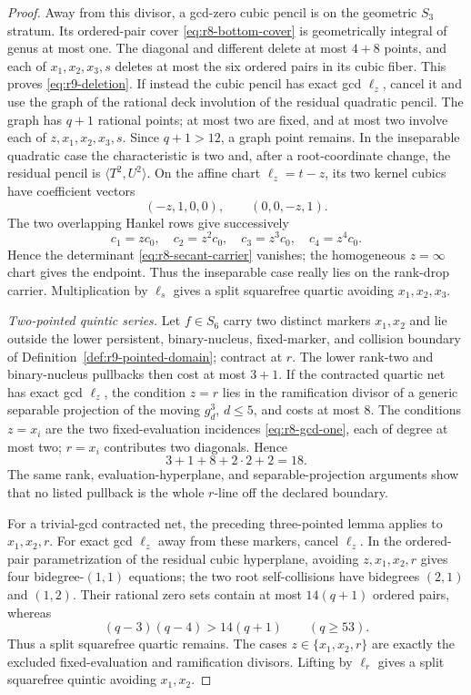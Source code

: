 \begin{proof}
Away from this divisor, a gcd-zero cubic pencil is on the geometric
$S_3$ stratum.  Its ordered-pair cover \eqref{eq:r8-bottom-cover} is
geometrically integral
of genus at most one.  The diagonal and different delete at most
$4+8$ points, and each of $x_1,x_2,x_3,s$ deletes at most the six
ordered pairs in its cubic fiber.  This proves
\eqref{eq:r9-deletion}.  If instead the
cubic pencil has exact gcd $\ell_z$, cancel it and use the graph of
the rational deck involution of the residual quadratic pencil.  The
graph has $q+1$ rational points; at most two are fixed, and at most two
involve each of $z,x_1,x_2,x_3,s$.  Since $q+1>12$, a graph point
remains.  In the inseparable quadratic case the characteristic is two
and, after a root-coordinate change, the residual pencil is
$\langle T^2,U^2\rangle$.  On the affine chart
$\ell_z=t-z$, its two kernel cubics have coefficient vectors
\[
             (-z,1,0,0),\qquad(0,0,-z,1).
\]
The two overlapping Hankel rows give successively
\[
 c_1=zc_0,\quad c_2=z^2c_0,\quad
 c_3=z^3c_0,\quad c_4=z^4c_0.
\]
Hence the determinant \eqref{eq:r8-secant-carrier} vanishes; the
homogeneous $z=\infty$
chart gives the endpoint.  Thus the inseparable case really lies on
the rank-drop carrier.  Multiplication by $\ell_s$ gives a split
squarefree quartic avoiding $x_1,x_2,x_3$.

\emph{Two-pointed quintic series.}
Let $f\in S_6$ carry two distinct markers $x_1,x_2$ and lie outside
the lower persistent, binary-nucleus, fixed-marker, and collision
boundary of Definition~\ref{def:r9-pointed-domain}; contract at $r$.
The lower rank-two and binary-nucleus pullbacks then cost at most
$3+1$.  If the contracted quartic net has exact gcd $\ell_z$, the
condition $z=r$ lies in the ramification divisor of a generic
separable projection of the moving $g^3_d$, $d\leq5$, and costs at
most $8$.  The conditions $z=x_i$ are the two fixed-evaluation
incidences \eqref{eq:r8-gcd-one}, each of degree at most two;
$r=x_i$ contributes two
diagonals.  Hence
\begin{equation}\label{eq:r9-two-point-budget}
             3+1+8+2\cdot2+2=18.
\end{equation}
The same rank, evaluation-hyperplane, and separable-projection
arguments show that no listed pullback is the whole $r$-line off the
declared boundary.

For a trivial-gcd contracted net, the preceding three-pointed lemma
applies to $x_1,x_2,r$.  For exact gcd $\ell_z$ away from these
markers, cancel $\ell_z$.  In the ordered-pair parametrization of the
residual cubic hyperplane, avoiding $z,x_1,x_2,r$ gives four
bidegree-$(1,1)$ equations; the two root self-collisions have
bidegrees $(2,1)$ and $(1,2)$.  Their rational zero sets contain at
most $14(q+1)$ ordered pairs, whereas
\[
             (q-3)(q-4)>14(q+1)\qquad(q\geq53).
\]
Thus a split squarefree quartic remains.  The cases
$z\in\{x_1,x_2,r\}$ are exactly the excluded fixed-evaluation and
ramification divisors.  Lifting by $\ell_r$ gives a split squarefree
quintic avoiding $x_1,x_2$.


\end{proof}
